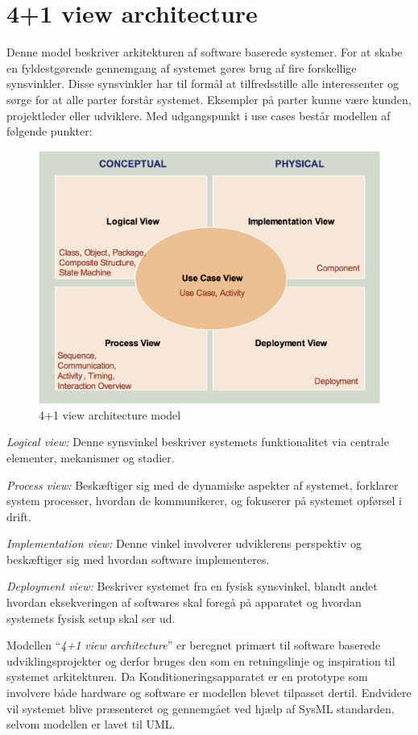 \section{4+1 view architecture} \label{title:viewArc}
Denne model beskriver arkitekturen af software baserede systemer. For at skabe en fyldestgørende gennemgang af systemet gøres brug af fire forskellige synsvinkler. Disse synsvinkler har til formål at  tilfredsstille alle interessenter og sørge for at alle parter forstår systemet. Eksempler på parter kunne være kunden, projektleder eller udviklere. Med udgangspunkt i use cases består modellen af følgende punkter: 

\begin{figure}[H]
	\includegraphics[width=\textwidth]{filer/4plus1model.png}
	\caption{4+1 view architecture model}\label{fig:4plus1model}
\end{figure}

\textit{Logical view:} Denne synsvinkel beskriver systemets funktionalitet via centrale elementer, mekanismer og stadier.

\textit{Process view:} Beskæftiger sig med de dynamiske aspekter af systemet, forklarer system processer, hvordan de kommunikerer, og fokuserer på systemet opførsel i drift.

\textit{Implementation view:} Denne vinkel involverer udviklerens perspektiv og beskæftiger sig med hvordan software implementeres.

\textit{Deployment view:} Beskriver systemet fra en fysisk synsvinkel, blandt andet hvordan eksekveringen af softwares skal foregå på apparatet og hvordan systemets fysisk setup skal ser ud. 

Modellen “\textit{4+1 view architecture}” er beregnet primært til software baserede udviklingsprojekter og derfor bruges den som en retningslinje og inspiration til systemet arkitekturen. Da Konditioneringsapparatet er en prototype som involvere både hardware og software er modellen blevet tilpasset dertil. Endvidere vil systemet blive præsenteret og gennemgået ved hjælp af SysML standarden, selvom modellen er lavet til UML.

